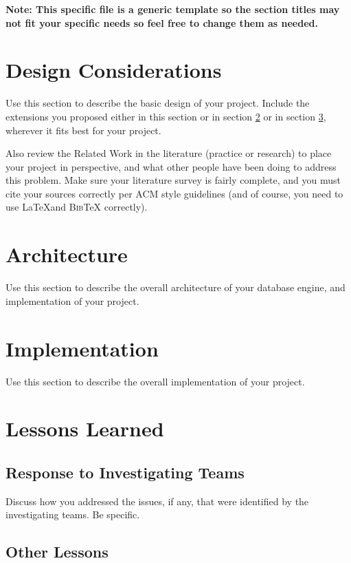 \documentclass[sigconf]{acmart}
\def\BibTeX{\textsc{Bib}\TeX}
\begin{document}
{\bf Note: This specific file is a generic template so the
  section titles may not fit your specific needs so feel
  free to change them as needed.}

\section{Design Considerations}
\label{design considerations}

Use this section to describe the basic design of your project. Include
the extensions you proposed either in this section or in section
\ref{architecture} or in section \ref{implementation}, wherever it
fits best for your project.

Also review the Related Work in the literature (practice or research)
to place your project in perspective, and what other people have been
doing to address this problem. Make sure your literature survey is
fairly complete, and you must cite your sources correctly per ACM
style guidelines (and of course, you need to use \LaTeX and \BibTeX
correctly).

\section{Architecture}
\label{architecture}

Use this section to describe the overall architecture of your database
engine, and implementation of your
project.

\section{Implementation}
\label{implementation}

Use this section to describe the overall implementation of your
project.

\section{Lessons Learned}
\label{lessons learned}

\subsection{Response to Investigating Teams}
\label{response}

Discuss how you addressed the issues, if any, that were identified by
the investigating teams. Be specific.

\subsection{Other Lessons}
\label{other lessons}
\end{document}

